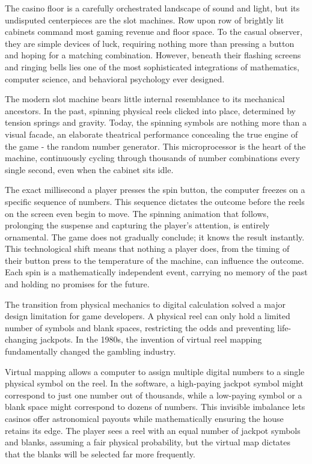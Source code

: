 \documentclass[12pt,twoside,openany]{book}
\begin{document}
The casino floor is a carefully orchestrated landscape of sound and light, but its undisputed centerpieces are the slot machines. Row upon row of brightly lit cabinets command most gaming revenue and floor space. To the casual observer, they are simple devices of luck, requiring nothing more than pressing a button and hoping for a matching combination. However, beneath their flashing screens and ringing bells lies one of the most sophisticated integrations of mathematics, computer science, and behavioral psychology ever designed.

The modern slot machine bears little internal resemblance to its mechanical ancestors. In the past, spinning physical reels clicked into place, determined by tension springs and gravity. Today, the spinning symbols are nothing more than a visual facade, an elaborate theatrical performance concealing the true engine of the game - the random number generator. This microprocessor is the heart of the machine, continuously cycling through thousands of number combinations every single second, even when the cabinet sits idle.

The exact millisecond a player presses the spin button, the computer freezes on a specific sequence of numbers. This sequence dictates the outcome before the reels on the screen even begin to move. The spinning animation that follows, prolonging the suspense and capturing the player's attention, is entirely ornamental. The game does not gradually conclude; it knows the result instantly. This technological shift means that nothing a player does, from the timing of their button press to the temperature of the machine, can influence the outcome. Each spin is a mathematically independent event, carrying no memory of the past and holding no promises for the future.

The transition from physical mechanics to digital calculation solved a major design limitation for game developers. A physical reel can only hold a limited number of symbols and blank spaces, restricting the odds and preventing life-changing jackpots. In the 1980s, the invention of virtual reel mapping fundamentally changed the gambling industry.

Virtual mapping allows a computer to assign multiple digital numbers to a single physical symbol on the reel. In the software, a high-paying jackpot symbol might correspond to just one number out of thousands, while a low-paying symbol or a blank space might correspond to dozens of numbers. This invisible imbalance lets casinos offer astronomical payouts while mathematically ensuring the house retains its edge. The player sees a reel with an equal number of jackpot symbols and blanks, assuming a fair physical probability, but the virtual map dictates that the blanks will be selected far more frequently.
\end{document}
